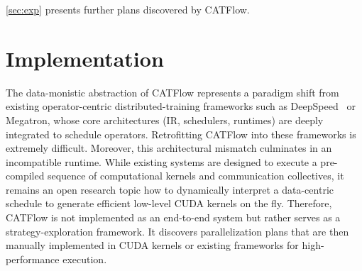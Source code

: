 \documentclass[letterpaper,twocolumn,10pt]{article}
\newcommand{\name}{CATFlow}
\begin{document}
\cref{sec:exp} presents further plans discovered by \name{}.




\vspace{-.5em}
\section{Implementation}
\label{sec:automated}

The data-monistic abstraction of \name{} represents a paradigm shift from existing operator-centric distributed-training frameworks such as DeepSpeed~\cite{rasley2020deepspeed} or Megatron, whose core architectures (IR, schedulers, runtimes) are deeply integrated to schedule operators. Retrofitting \name{} into these frameworks is extremely difficult. Moreover, this architectural mismatch culminates in an incompatible runtime. While existing systems are designed to execute a pre-compiled sequence of computational kernels and communication collectives, it remains an open research topic how to dynamically interpret a data-centric schedule to generate efficient low-level CUDA kernels on the fly. Therefore, \name{} is not implemented as an end-to-end system but rather serves as a strategy-exploration framework. It discovers parallelization plans that are then manually implemented in CUDA kernels or existing frameworks for high-performance execution.
\end{document}
